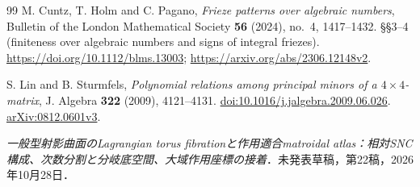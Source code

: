 \begin{thebibliography}{99}
M. Cuntz, T. Holm and C. Pagano,
\emph{Frieze patterns over algebraic numbers},
Bulletin of the London Mathematical Society \textbf{56} (2024), no.~4, 1417--1432.
\S\S3--4 (finiteness over algebraic numbers and signs of integral friezes).
\url{https://doi.org/10.1112/blms.13003};
\url{https://arxiv.org/abs/2306.12148v2}.

S. Lin and B. Sturmfels,
\emph{Polynomial relations among principal minors of a $4\times4$-matrix},
J. Algebra \textbf{322} (2009), 4121--4131.
\href{https://doi.org/10.1016/j.jalgebra.2009.06.026}{doi:10.1016/j.jalgebra.2009.06.026}.
\href{https://arxiv.org/abs/0812.0601}{arXiv:0812.0601v3}.

\emph{一般型射影曲面のLagrangian torus fibrationと作用適合matroidal atlas：相対SNC構成、次数分割と分岐底空間、大域作用座標の接着}．未発表草稿，第22稿，2026年10月28日．

\end{thebibliography}

